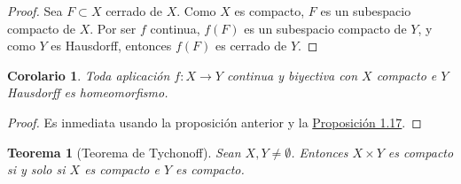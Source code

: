 \documentclass[12pt]{report}
\newtheorem{corollary}{Corolario}[chapter]
\newtheorem{theorem}{Teorema}[chapter]
\theoremstyle{definition}
\theoremstyle{definition}
\theoremstyle{remark}
\begin{document}
\begin{proof}
Sea $F \subset X$ cerrado de $X$. Como $X$ es compacto, $F$ es un subespacio compacto de $X$. Por ser $f$ continua, $f(F)$ es un subespacio compacto de $Y$, y como $Y$ es Hausdorff, entonces $f(F)$ es cerrado de $Y$.
\end{proof}

\begin{corollary}
Toda aplicación $f \colon X \to Y$ continua y biyectiva con $X$ compacto e $Y$ Hausdorff es homeomorfismo.
\end{corollary}

\begin{proof}
Es inmediata usando la proposición anterior y la \hyperref[prop1.17.]{\color{blue}Proposición 1.17}.
\end{proof}

\vspace{2mm}
\begin{theorem}[Teorema de Tychonoff]
Sean $X,Y \neq \emptyset$. Entonces $X \times Y$ es compacto si y solo si $X$ es compacto e $Y$ es compacto.
\end{theorem}
\end{document}

